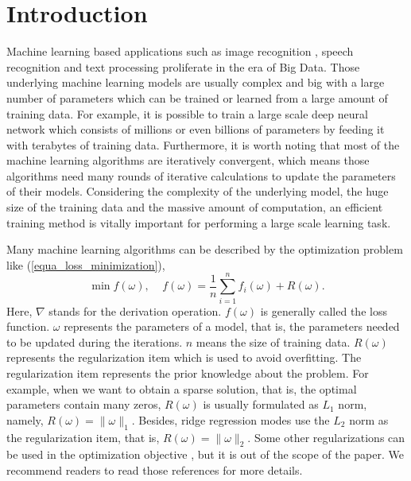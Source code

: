 \documentclass[preprint,review,11pt,a4paper]{elsarticle}
\begin{document}
\section{Introduction}
\label{introduction}

Machine learning based applications such as image recognition \cite{Coates2011An}, speech recognition \cite{dahl2012context} and text processing \cite{collobert2008unified} proliferate in the era of Big Data. Those underlying machine learning models are usually complex and big with a large number of parameters which can be trained or learned from a large amount of training data. For example, it is possible to train a large scale deep neural network which consists of millions or even billions of parameters by feeding it with terabytes of training data. Furthermore, it is worth noting that most of the machine learning algorithms are iteratively convergent, which means those algorithms need many rounds of iterative calculations to update the parameters of their models. Considering the complexity of the underlying model, the huge size of the training data and the massive amount of computation, an efficient training method is vitally important for performing a large scale learning task.

Many machine learning algorithms can be described by the optimization problem like (\ref{equa_loss_minimization}),
\begin{equation}
\label{equa_loss_minimization}
\min f(\omega),~~~~~f(\omega)=\frac{1}{n}\sum\limits_{i=1}^n f_i(\omega) + R(\omega).
\end{equation}  Here, $\nabla$ stands for the derivation operation. $f(\omega)$ is generally called the loss function.  $\omega$ represents the parameters of a model, that is, the parameters needed to be updated during the iterations. $n$ means the size of training data. $R(\omega)$ represents the regularization item which is used to avoid overfitting. The regularization item represents the prior knowledge about the problem. For example, when we want to obtain a sparse solution, that is, the optimal parameters contain many zeros, $R(\omega)$ is usually formulated as $L_1$ norm, namely, $R(\omega) = \lVert \omega \rVert_1$. Besides, ridge regression modes use the $L_2$ norm as the regularization item, that is, $R(\omega) = \lVert \omega \rVert_2$. Some other regularizations can be used in the optimization objective \cite{Vidaurre:2013cu, Gnecco2015Learning, Cucker2002On}, but it is out of the scope of the paper. We recommend readers to read those references for more details. 
\end{document}

